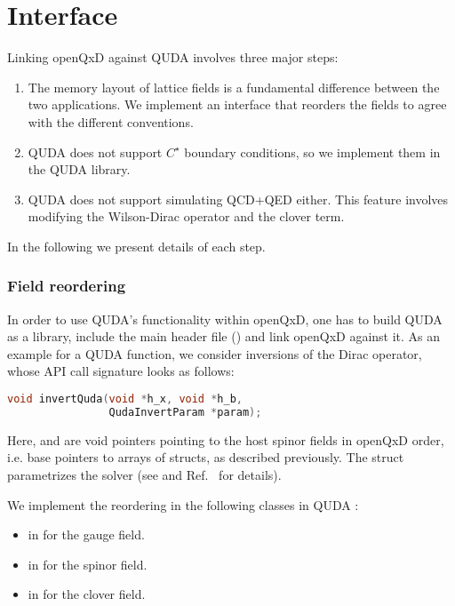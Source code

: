 \chapter{Interface}
\label{ch:p1:interface}

Linking openQxD against QUDA involves three major steps:

\begin{enumerate}
\item{The memory layout of lattice fields is a fundamental difference between the two applications. We implement an interface that reorders the fields to agree with the different conventions.}
\item{QUDA does not support $C^\star$ boundary conditions, so we implement them in the QUDA library.}
\item{QUDA does not support simulating QCD+QED either. This feature involves modifying the Wilson-Dirac operator and the clover term.}
\end{enumerate}

In the following we present details of each step.

\subsection{Field reordering}

In order to use QUDA's functionality within openQxD, one has to build QUDA as a library, include the main header file () and link openQxD against it. 
As an example for a QUDA function, we consider inversions of the Dirac operator, whose API call signature looks as follows:

\begin{lstlisting}[language=C++]
void invertQuda(void *h_x, void *h_b,
                QudaInvertParam *param);
\end{lstlisting}

Here,  and  are void pointers pointing to the host spinor fields in openQxD order, i.e. base pointers to arrays of  structs, as described previously. The  struct parametrizes the solver (see  and Ref.~\cite{QUDApaper} for details).


We implement the reordering in the following classes in QUDA \cite{QUDApaper}:
\begin{itemize}
  \item {} in  for the gauge field.
  \item {} in  for the spinor field.
  \item {} in  for the clover field.
\end{itemize}

